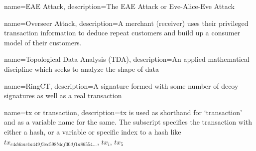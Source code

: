 

{
    name=EAE Attack,
    description={The EAE Attack or Eve-Alice-Eve Attack}
}

{
    name=Overseer Attack,
    description={A merchant (receiver) uses their privileged transaction information to deduce repeat customers and build up a consumer model of their customers.}
}

{
    name=Topological Data Analysis (TDA),
    description={An applied mathematical discipline which seeks to analyze the shape of data}
}

{
  name=RingCT,
  description={A signature formed with some number of decoy signatures as well as a real transaction}
}

{
  name=tx or transaction,
  description={tx is used as shorthand for `transaction'  and as a variable name for the same.  The subscript specifies the transaction with either a hash, or a variable or specific index to a hash like $tx_{e4ddaac1a449f3ec598b4cf30df1a86554...}$, $tx_i$, $tx_5$}
}

